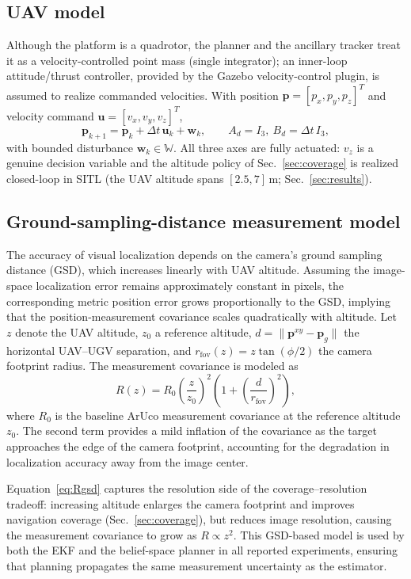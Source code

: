 \documentclass[letterpaper, 10 pt, conference]{ieeeconf}  %
\begin{document}
\subsection{UAV model}
Although the platform is a quadrotor, the planner and the ancillary tracker treat
it as a  {velocity-controlled point mass} (single integrator); an
inner-loop attitude/thrust controller, provided by the Gazebo velocity-control
plugin, is assumed to realize commanded velocities. With position
$\mathbf{p}=[p_x,p_y,p_z]^T$ and velocity command $\mathbf{u}=[v_x,v_y,v_z]^T$,
\begin{equation}
\mathbf{p}_{k+1} = \mathbf{p}_k + \Delta t\, \mathbf{u}_k + \mathbf{w}_k,
\qquad A_d=I_3,\ B_d=\Delta t\, I_3,
\label{eq:uav_disc}
\end{equation}
with bounded disturbance $\mathbf{w}_k\in\mathbb{W}$. All three axes are fully
actuated: $v_z$ is a genuine decision variable and the altitude policy of
Sec.~\ref{sec:coverage} is realized closed-loop in SITL (the UAV altitude spans
$[2.5,7]$\,m; Sec.~\ref{sec:results}).




\subsection{Ground-sampling-distance measurement model}

The accuracy of visual localization depends on the camera's ground sampling distance (GSD), which increases linearly with UAV altitude. Assuming the image-space localization error remains approximately constant in pixels, the corresponding metric position error grows proportionally to the GSD, implying that the position-measurement covariance scales quadratically with altitude. Let $z$ denote the UAV altitude, $z_0$ a reference altitude, $d=\|\mathbf{p}^{xy}-\mathbf{p}_g\|$ the horizontal UAV--UGV separation, and $r_{\mathrm{fov}}(z)=z\tan(\phi/2)$ the camera footprint radius. The measurement covariance is modeled as
\begin{equation}
R(z)=R_0\left(\frac{z}{z_0}\right)^2
\left(1+\left(\frac{d}{r_{\mathrm{fov}}}\right)^2\right),
\label{eq:Rgsd}
\end{equation}
where $R_0$ is the baseline ArUco measurement covariance at the reference altitude $z_0$. The second term provides a mild inflation of the covariance as the target approaches the edge of the camera footprint, accounting for the degradation in localization accuracy away from the image center.

Equation~\eqref{eq:Rgsd} captures the resolution side of the coverage--resolution tradeoff: increasing altitude enlarges the camera footprint and improves navigation coverage (Sec.~\ref{sec:coverage}), but reduces image resolution, causing the measurement covariance to grow as $R\propto z^2$. This GSD-based model is used by both the EKF and the belief-space planner in all reported experiments, ensuring that planning propagates the same measurement uncertainty as the estimator.
\end{document}
